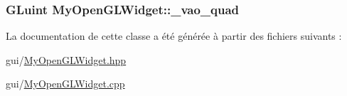 \hypertarget{class_my_open_g_l_widget_a63a814817d1af6ea49036edac108183b}{
\subsubsection[{\+\_\+vao\+\_\+quad}]{\setlength{\rightskip}{0pt plus 5cm}G\+Luint My\+Open\+G\+L\+Widget\+::\+\_\+vao\+\_\+quad\hspace{0.3cm}{\ttfamily [private]}}}\label{class_my_open_g_l_widget_a63a814817d1af6ea49036edac108183b}


La documentation de cette classe a été générée à partir des fichiers suivants \+:\begin{DoxyCompactItemize}
\item 
gui/\hyperlink{_my_open_g_l_widget_8hpp}{My\+Open\+G\+L\+Widget.\+hpp}\item 
gui/\hyperlink{_my_open_g_l_widget_8cpp}{My\+Open\+G\+L\+Widget.\+cpp}\end{DoxyCompactItemize}
